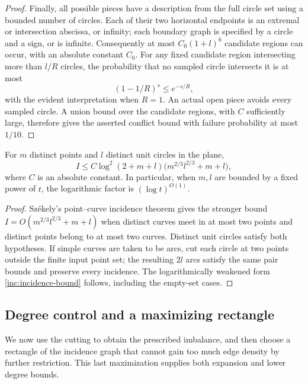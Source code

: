 \begin{proof}
Finally, all possible pieces have a description from the full circle
set using a bounded number of circles. Each of their two horizontal
endpoints is an extremal or intersection abscissa, or infinity; each
boundary graph is specified by a circle and a sign, or is infinite.
Consequently at most \(C_0(1+l)^6\) candidate regions can occur, with
an absolute constant \(C_0\). For any fixed candidate region intersecting
more than \(l/R\) circles, the probability that no sampled circle
intersects it is at most
\[
 (1-1/R)^s\le e^{-s/R},
\]
with the evident interpretation when \(R=1\). An actual open piece
avoids every sampled circle. A union bound over the candidate regions,
with \(C\) sufficiently large, therefore gives the asserted conflict
bound with failure probability at most \(1/10\).
\end{proof}

\begin{proposition}\label{inc:incidence}
For \(m\) distinct points and \(l\) distinct unit circles in the plane,
\begin{equation}\label{inc:incidence-bound}
 I\le C\log^2(2+m+l)
       \bigl(m^{2/3}l^{2/3}+m+l\bigr),
\end{equation}
where \(C\) is an absolute constant. In particular, when \(m,l\) are
bounded by a fixed power of \(t\), the logarithmic factor is
\((\log t)^{O(1)}\).
\end{proposition}

\begin{proof}
Sz\'ekely's point--curve incidence theorem
\cite[Theorem~8]{Szekely1997} gives the stronger bound
\(I=O(m^{2/3}l^{2/3}+m+l)\) when distinct curves meet in at most two
points and distinct points belong to at most two curves. Distinct unit
circles satisfy both hypotheses. If simple curves are taken to be arcs,
cut each circle at two points outside the finite input point set; the
resulting \(2l\) arcs satisfy the same pair bounds and preserve every
incidence. The logarithmically weakened form
\eqref{inc:incidence-bound} follows, including the empty-set cases.
\end{proof}

\subsection{Degree control and a maximizing rectangle}

We now use the cutting to obtain the prescribed imbalance, and then
choose a rectangle of the incidence graph that cannot gain too much
edge density by further restriction. This last maximization supplies
both expansion and lower degree bounds.

